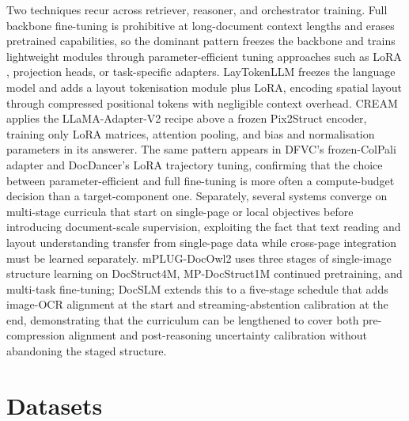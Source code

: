 \documentclass[11pt]{article}
\begin{document}
Two techniques recur across retriever, reasoner, and orchestrator training. Full backbone fine-tuning is prohibitive at long-document context lengths and erases pretrained capabilities, so the dominant pattern freezes the backbone and trains lightweight modules through parameter-efficient tuning approaches such as LoRA \cite{hu2022lora}, projection heads, or task-specific adapters. LayTokenLLM \cite{zhu2025simple} freezes the language model and adds a layout tokenisation module plus LoRA, encoding spatial layout through compressed positional tokens with negligible context overhead. CREAM \cite{zhang2024cream} applies the LLaMA-Adapter-V2 recipe above a frozen Pix2Struct encoder, training only LoRA matrices, attention pooling, and bias and normalisation parameters in its answerer. The same pattern appears in DFVC's frozen-ColPali adapter and DocDancer's LoRA trajectory tuning, confirming that the choice between parameter-efficient and full fine-tuning is more often a compute-budget decision than a target-component one. Separately, several systems converge on multi-stage curricula that start on single-page or local objectives before introducing document-scale supervision, exploiting the fact that text reading and layout understanding transfer from single-page data while cross-page integration must be learned separately. mPLUG-DocOwl2 \cite{hu2025mplugdocowl2} uses three stages of single-image structure learning on DocStruct4M, MP-DocStruct1M continued pretraining, and multi-task fine-tuning; DocSLM \cite{hannan2025docslm} extends this to a five-stage schedule that adds image-OCR alignment at the start and streaming-abstention calibration at the end, demonstrating that the curriculum can be lengthened to cover both pre-compression alignment and post-reasoning uncertainty calibration without abandoning the staged structure.

\section{Datasets}
\label{sec:datasets}
\end{document}
